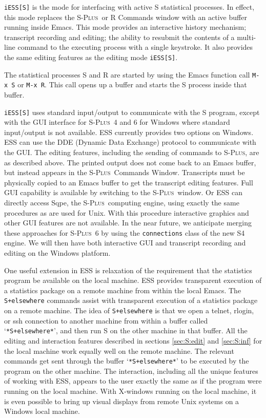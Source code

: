 \documentclass{article}
\newcommand*{\Splus}{\textsc{S-Plus}}
\newcommand{\stexttt}[1]{{\small\texttt{#1}}}
\newcommand{\file}[1]{`\stexttt{#1}'}
\begin{document}
\stexttt{iESS[S]} is the mode for interfacing with active S
statistical processes.  In effect, this mode replaces the \Splus\ or R
Commands window with an active buffer running inside Emacs.  This mode
provides an interactive history mechanism; transcript recording and
editing; the ability to resubmit the contents of a multi-line command
to the executing process with a single keystroke.  It also provides
the same editing features as the editing mode \stexttt{iESS[S]}.

The statistical processes S and R are started by using the Emacs
function call \stexttt{M-x~S} or \stexttt{M-x~R}.  This call opens up
a buffer and starts the S process inside that buffer.

\stexttt{iESS[S]} uses standard input/output to communicate with the S
program, except with the GUI interface for \Splus\ 4 and 6 for Windows
where standard input/output is not available.  ESS currently provides
two options on Windows.  ESS can use the DDE (Dynamic Data Exchange)
protocol to communicate with the GUI.  The editing features, including
the sending of commands to \Splus, are as described above.  The
printed output does not come back to an Emacs buffer, but instead
appears in the \Splus\ Commands Window.  Transcripts must be
physically copied to an Emacs buffer to get the transcript editing
features.  Full GUI capability is available by switching to the
\Splus\ window.  Or ESS can directly access Sqpe, the \Splus\ 
computing engine, using exactly the same procedures as are used for
Unix.  With this procedure interactive graphics and other GUI features
are not available.  In the near future, we anticipate merging these
approaches for \Splus\ 6 by using the \stexttt{connections} class of
the new S4 engine.  We will then have both interactive GUI and
transcript recording and editing on the Windows platform.

One useful extension in ESS is relaxation of the requirement that the
statistics program be available on the local machine.  ESS provides
transparent execution of a statistics package on a remote machine from
within the local Emacs.  The \stexttt{S+elsewhere} commands assist
with transparent execution of a statistics package on a remote
machine.  The idea of \stexttt{S+elsewhere} is that we open a telnet,
rlogin, or ssh connection to another machine from within a buffer
called \file{*S+elsewhere*}, and then run S on the other machine in
that buffer.  All the editing and interaction features described in
sections \ref{sec:S:edit} and \ref{sec:S:inf} for the local machine
work equally well on the remote machine.  The relevant commands get
sent through the buffer \file{*S+elsewhere*} to be executed by the
program on the other machine.  The interaction, including all the
unique features of working with ESS, appears to the user exactly the
same as if the program were running on the local machine.  With
X-windows running on the local machine, it is even possible to bring
up visual displays from remote Unix systems on a Windows local
machine.
\end{document}
